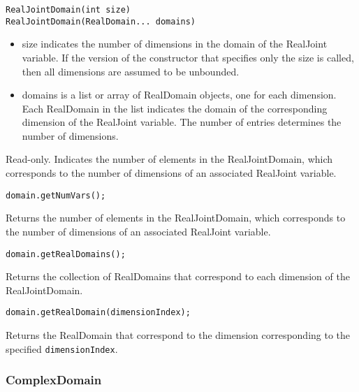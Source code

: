 \ifjava
\begin{lstlisting}
RealJointDomain(int size)
RealJointDomain(RealDomain... domains)
\end{lstlisting}

\begin{itemize}
\item size indicates the number of dimensions in the domain of the RealJoint variable.  If the version of the constructor that specifies only the size is called, then all dimensions are assumed to be unbounded.
\item domains is a list or array of RealDomain objects, one for each dimension.  Each RealDomain in the list indicates the domain of the corresponding dimension of the RealJoint variable.  The number of entries determines the number of dimensions.
\end{itemize}
\fi

\ifmatlab
{}


Read-only.  Indicates the number of elements in the RealJointDomain, which corresponds to the number of dimensions of an associated RealJoint variable.
\fi

\ifjava
{}


\begin{lstlisting}
domain.getNumVars();
\end{lstlisting}

Returns the number of elements in the RealJointDomain, which corresponds to the number of dimensions of an associated RealJoint variable.


\begin{lstlisting}
domain.getRealDomains();
\end{lstlisting}

Returns the collection of RealDomains that correspond to each dimension of the RealJointDomain.


\begin{lstlisting}
domain.getRealDomain(dimensionIndex);
\end{lstlisting}

Returns the RealDomain that correspond to the dimension corresponding to the specified \texttt{dimensionIndex}.

\fi


\subsubsection{ComplexDomain}
\label{sec:ComplexDomain}

